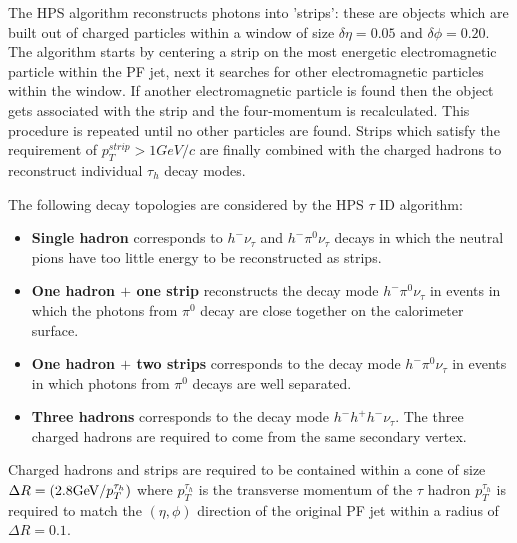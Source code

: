 The HPS algorithm 
reconstructs photons into 'strips': these are objects which are built
out of charged particles within a window of size $\delta\eta=0.05$
and $\delta\phi=0.20$. The algorithm starts by centering a strip on the
most energetic electromagnetic particle within the PF jet, next it searches
for other electromagnetic particles within the window. If another electromagnetic
particle is found then the object gets associated with the strip and
the four-momentum is recalculated. This procedure is repeated until no other
particles are found. Strips which satisfy the requirement of $p_{T}^{strip}>1GeV/c$
are finally combined with the charged hadrons to reconstruct individual
$\tau_{h}$ decay modes.

The following decay topologies are considered by the HPS $\tau$ ID algorithm:
\begin{itemize}
\item{\bf Single hadron}
      corresponds to $ h^{-} \nu_{\tau}$
      and $ h^{-} \pi^{0} \nu_{\tau}$ decays
      in which the neutral pions have too little energy to be reconstructed as strips.
\item{\bf One hadron $+$ one strip}
      reconstructs the decay mode $ h^{-} \pi^{0} \nu_{\tau}$
      in events in which the photons from $\pi^{0}$ decay
      are close together on the calorimeter surface.
\item{\bf One hadron $+$ two strips}
      corresponds to the decay mode $ h^{-} \pi^{0} \nu_{\tau}$
      in events in which photons from $\pi^{0}$ decays are well separated.
\item{\bf Three hadrons}
      corresponds to the decay mode $ h^{-} h^{+} h^{-} \nu_{\tau}$.
      The three charged hadrons are required                                                                                                      
      to come from the same secondary vertex.
\end {itemize}

Charged hadrons and strips are required to be contained within a cone
of size $\Delta R=(2.8\mathrm{GeV}/p_{T}^{\tau_{h}})$ where $p_{T}^{\tau_{h}}$ is 
the transverse momentum of the $\tau$ hadron $p_{T}^{\tau_{h}}$ is 
required to match the $(\eta,\phi)$ direction of the original PF jet within
a radius of $\Delta R=0.1$. 

